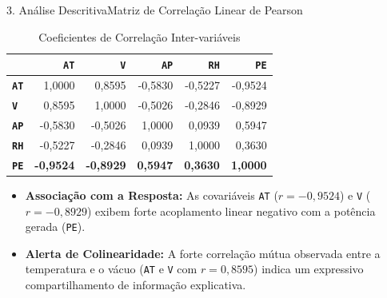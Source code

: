 \documentclass[10pt,aspectratio=169]{beamer}
\begin{document}
\begin{frame}{3. Análise Descritiva}{Matriz de Correlação Linear de Pearson}
    \begin{table}
        \centering
        \caption{Coeficientes de Correlação Inter-variáveis}
        \label{tab:correlacao}
        \small
        \begin{tabular}{lrrrrr}
            \toprule
            & \textbf{\texttt{AT}} & \textbf{\texttt{V}} & \textbf{\texttt{AP}} & \textbf{\texttt{RH}} & \textbf{\texttt{PE}} \\
            \midrule
            \textbf{\texttt{AT}} & 1,0000  & 0,8595  & -0,5830 & -0,5227 & -0,9524 \\
            \textbf{\texttt{V}}  & 0,8595  & 1,0000  & -0,5026 & -0,2846 & -0,8929 \\
            \textbf{\texttt{AP}}  & -0,5830 & -0,5026 & 1,0000  & 0,0939  & 0,5947  \\
            \textbf{\texttt{RH}}  & -0,5227 & -0,2846 & 0,0939  & 1,0000  & 0,3630  \\
            \midrule
            \textbf{\texttt{PE}}  & \textbf{-0,9524} & \textbf{-0,8929} & \textbf{0,5947} & \textbf{0,3630} & \textbf{1,0000} \\
            \bottomrule
        \end{tabular}
    \end{table}
    \begin{itemize}
        \item \textbf{Associação com a Resposta:} As covariáveis \texttt{AT} ($r = -0,9524$) e \texttt{V} ($r = -0,8929$) exibem forte acoplamento linear negativo com a potência gerada (\texttt{PE}).
        \item \textbf{Alerta de Colinearidade:} A forte correlação mútua observada entre a temperatura e o vácuo (\texttt{AT} e \texttt{V} com $r = 0,8595$) indica um expressivo compartilhamento de informação explicativa.
    \end{itemize}
\end{frame}
\end{document}
